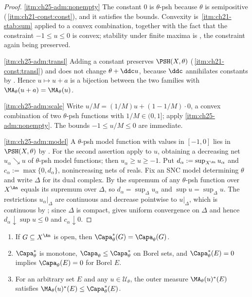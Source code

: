 \begin{proof}
\cref{itm:ch25-adm:nonempty}  The constant $0$ is $\theta$-psh because
$\theta$ is semipositive
(\,\cref{itm:ch21-const:const}), and it satisfies
the bounds.  Convexity is
\,\cref{itm:ch21-stab:sum} applied to a convex
combination, together with the fact that the constraint $-1\leq u\leq0$ is
convex; stability under finite maxima is
, the constraint again being preserved.

\cref{itm:ch25-adm:transl}  Adding a constant preserves $\PSH(X,\theta)$
(\,\cref{itm:ch21-const:transl}) and does not change
$\theta+\ddc u$, because $\ddc$ annihilates constants by
.  Hence $u\mapsto u+a$ is a bijection between the two
families with $\MA_\theta(u+a)=\MA_\theta(u)$.

\cref{itm:ch25-adm:scale}  Write $u/M=(1/M)u+(1-1/M)\cdot0$, a convex
combination of two $\theta$-psh functions with $1/M\in(0,1]$; apply
\cref{itm:ch25-adm:nonempty}.  The bounds $-1\leq u/M\leq0$ are immediate.

\cref{itm:ch25-adm:model}  A $\theta$-psh model function with values in
$[-1,0]$ lies in $\PSH(X,\theta)$ by
.  For the second assertion apply
 to $u$, obtaining a decreasing net
$u_\alpha\searrow u$ of $\theta$-psh model functions; then
$u_\alpha\geq u\geq-1$.  Put $d_\alpha:=\sup_{X^{\An}}u_\alpha$ and
$c_\alpha:=\max\{0,d_\alpha\}$, nonincreasing nets of reals.  Fix an SNC model determining $\theta$ and
write $\Delta$ for its dual complex.  By
 the supremum of any $\theta$-psh function
over $X^{\An}$ equals its supremum over $\Delta$, so
$d_\alpha=\sup_\Delta u_\alpha$ and $\sup u=\sup_\Delta u$.  The
restrictions $u_\alpha|_\Delta$ are continuous and decrease pointwise to
$u|_\Delta$, which is continuous by
; since $\Delta$ is compact,
 gives uniform convergence on $\Delta$ and hence
$d_\alpha\downarrow\sup u\leq0$ and $c_\alpha\downarrow0$.
\end{proof}

\begin{lemma}
\label{lem:ch25-inner-outer}
\begin{enumerate}
\item\label{itm:ch25-io:open}
 If $G\subseteq X^{\An}$ is open, then
 $\Capa_\theta^*(G)=\Capa_\theta(G)$.
\item\label{itm:ch25-io:mono}
 $\Capa_\theta^*$ is monotone, $\Capa_\theta\leq\Capa_\theta^*$ on Borel
 sets, and $\Capa^*_\theta(E)=0$ implies $\Capa_\theta(E)=0$ for Borel
 $E$.
\item\label{itm:ch25-io:radon}
 For an arbitrary set $E$ and any $u\in\mathcal U_\theta$, the outer
 measure $\MA_\theta(u)^*(E)$ satisfies
 $\MA_\theta(u)^*(E)\leq\Capa^*_\theta(E)$.
\end{enumerate}
\end{lemma}

